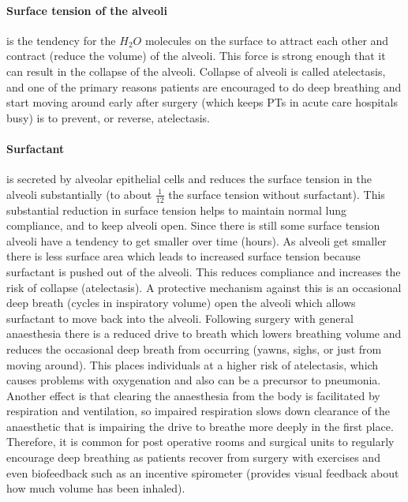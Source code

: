 \paragraph{Surface tension of the alveoli} is the tendency for the $H_2O$ molecules on the surface to attract each other and contract (reduce the volume) of the alveoli. This force is strong enough that it can result in the collapse of the alveoli. Collapse of alveoli is called atelectasis, and one of the primary reasons patients are encouraged to do deep breathing and start moving around early after surgery (which keeps PTs in acute care  hospitals busy) is to prevent, or reverse, atelectasis.

\paragraph{Surfactant} is secreted by alveolar epithelial cells and reduces the surface tension in the alveoli substantially (to about $\frac{1}{12}$ the surface tension without surfactant). This substantial reduction in surface tension helps to maintain normal lung compliance, and to keep alveoli open. Since there is still some surface tension alveoli have a tendency to get smaller over time (hours). As alveoli get smaller there is less surface area which leads to increased surface tension because surfactant is pushed out of the alveoli. This reduces compliance and increases the risk of collapse (atelectasis). A protective mechanism against this is an occasional deep breath (cycles in inspiratory volume) open the alveoli which allows surfactant to move back into the alveoli. Following surgery with general anaesthesia there is a reduced drive to breath which lowers breathing volume and reduces the occasional deep breath from occurring (yawns, sighs, or just from moving around). This places individuals at a higher risk of atelectasis, which causes problems with oxygenation and also can be a precursor to pneumonia. Another effect is that clearing the anaesthesia from the body is facilitated by respiration and ventilation, so impaired respiration slows down clearance of the anaesthetic that is impairing the drive to breathe more deeply in the first place. Therefore, it is common for post operative rooms and surgical units to regularly encourage deep breathing as patients recover from surgery with exercises and even biofeedback such as an incentive spirometer (provides visual feedback about how much volume has been inhaled). 


